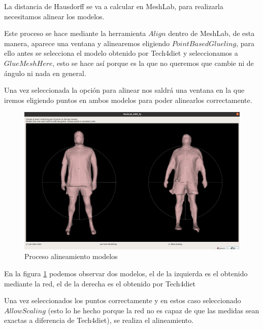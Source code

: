 La distancia de Hausdorff se va a calcular en MeshLab, para realizarla necesitamos alinear los modelos.

Este proceso se hace mediante la herramienta $Align$ dentro de MeshLab, de esta manera, aparece una ventana y alinearemos eligiendo $Point Based Glueling$, para ello antes se selecciona el modelo obtenido por Tech4diet y seleccionamos a $Glue Mesh Here$, esto se hace así porque es la que no queremos que cambie ni de ángulo ni nada en general.

Una vez seleccionada la opción para alinear nos saldrá una ventana en la que iremos eligiendo puntos en ambos modelos para poder alinearlos correctamente.

\begin{figure}[H]
	\centering
	\includegraphics[scale=0.3]{imagenes/alineamiento.png}
	\caption{Proceso alineamiento modelos}
	\label{fig:figura10}
\end{figure}

En la figura \ref{fig:figura10} podemos observar dos modelos, el de la izquierda es el obtenido mediante la red, el de la derecha es el obtenido por Tech4diet

Una vez seleccionados los puntos correctamente y en estos caso seleccionado $Allow Scaling$ (esto lo he hecho porque la red no es capaz de que las medidas sean exactas a diferencia de Tech4diet), se realiza el alineamiento.

